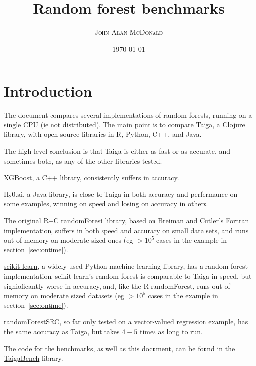 \documentclass[11pt,american,usenames,dvipsnames,svgnames,x11names,table]{article}
\begin{document}
 

\title{Random forest benchmarks}
\author{ \textsc{John Alan McDonald} }
\date{\today}
\maketitle

\def\dollar{\text{\$}}    

\section{Introduction}
The document compares several implementations of random forests,
running on a single CPU (ie not distributed).
The main point is to compare 
\href{https://github.com/wahpenayo/taiga/tree/master}{Taiga},
a Clojure library, with open source libraries in
R, Python, C++, and Java.

The high level conclusion is that Taiga is either as fast or as
accurate, and sometimes both, as any of the other libraries tested.

\href{https://xgboost.readthedocs.io/en/latest/}{XGBoost}, a C++
library, consistently suffers in accuracy.

\href{http://www.h2o.ai/}{$\mathrm{H_{2}0.ai}$}, a Java library, is
close to Taiga in both accuracy and performance on some examples,
winning on speed and losing on accuracy in others.

The original R+C 
\href{https://cran.r-project.org/web/packages/randomForest/randomForest.pdf}{randomForest}
library, based on Breiman and Cutler's Fortran implementation,
suffers in both speed and accuracy on small data sets,
and runs out of memory on moderate sized ones (eg $>10^5$ cases in the
example in section~\ref{sec:ontime}).

\href{http://scikit-learn.org/stable/}{scikit-learn}, a widely used
Python machine learning library, has a random forest implementation.
scikit-learn's random forest is comparable to Taiga in speed, 
but signioficantly worse in accuracy, and, like the R randomForest, runs
out of memory on moderate sized datasets (eg $>10^5$ cases in the
example in section~\ref{sec:ontime}).

\href{https://cran.r-project.org/web/packages/randomForestSRC/index.html}{randomForestSRC},
so far only tested on a vector-valued regression example, has the same accuracy as Taiga, but takes
$4-5$ times as long to run.

The code for the benchmarks, as well as this document, can be found in the
\href{https://github.com/wahpenayo/taigabench/tree/master}{TaigaBench}
 library.
\end{document}
